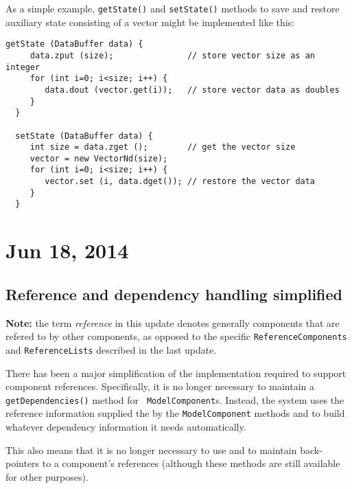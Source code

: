 \documentclass{article}
\begin{document}
As a simple example, {\tt getState()} and {\tt setState()} methods to
save and restore auxiliary state consisting of a vector might be
implemented like this:
\begin{lstlisting}[]
  getState (DataBuffer data) {
     data.zput (size);               // store vector size as an integer
     for (int i=0; i<size; i++) {
        data.dout (vector.get(i));   // store vector data as doubles
     }
  }

  setState (DataBuffer data) {
     int size = data.zget ();        // get the vector size
     vector = new VectorNd(size);
     for (int i=0; i<size; i++) {
        vector.set (i, data.dget()); // restore the vector data
     }
  }
\end{lstlisting}

\section*{Jun 18, 2014}

\subsection*{Reference and dependency handling simplified}

\begin{sideblock}
{\bf Note:} the term {\it reference} in this update denotes generally
components that are refered to by other components, as opposed to the
specific {\tt ReferenceComponents} and {\tt ReferenceLists} described
in the last update.
\end{sideblock}

There has been a major simplification of the implementation
required to support component references. Specifically, it is no
longer necessary to maintain a {\tt getDependencies()} method for {\tt
ModelComponent}s. Instead, the system uses the reference information
supplied the by the {\tt ModelComponent} methods
and
to build whatever dependency information it needs automatically.

This also means that it is no longer necessary to use
and
to maintain back-pointers to a component's references (although these
methods are still available for other purposes).
\end{document}
